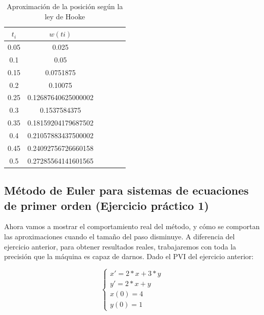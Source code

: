 \documentclass[12pt]{article}       %
\begin{document}
    \begin{table}[H]
        \centering
        \setlength\extrarowheight{2.5pt}
        
        \begin{tabular}{|c|c|c|c|c|c}
            \hline
            \textbf{$t_i$} & {\textbf{$w(ti)$}}\\ 
            \hline
                0.05  &    0.025 \\
                \hline
                 0.1   &   0.05 \\
                 \hline
                0.15  &    0.0751875 \\
                \hline
                 0.2  &    0.10075 \\
                 \hline
                0.25  &    0.12687640625000002 \\
                \hline
                 0.3   &   0.1537584375 \\
                 \hline
                0.35  &    0.18159204179687502 \\
                \hline
             0.4   &   0.21057883437500002 \\
             \hline
             0.45  &    0.24092756726660158 \\
             \hline
             0.5   &   0.27285564141601565 \\
             \hline
        \end{tabular}
        
        \caption{Aproximación de la posición según la ley de Hooke}           
    \end{table}

\subsection{Método de Euler para sistemas de ecuaciones de primer orden (Ejercicio práctico 1)}

Ahora vamos a mostrar el comportamiento real del método, y cómo se comportan las aproximaciones cuando el tamaño del paso disminuye. A diferencia del ejercicio anterior, para obtener resultados reales, trabajaremos con toda la precisión que la máquina es capaz de darnos. Dado el PVI del ejercicio anterior:

$$
\begin{cases}
x' = 2*x + 3 * y\\
y' = 2*x + y \\
x(0) = 4\\
y(0)=1
\end{cases}
$$
\end{document}
